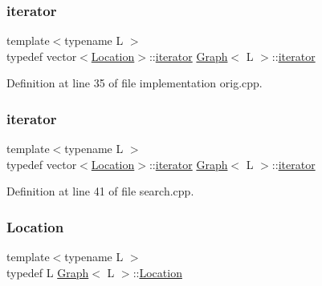 \subsubsection{\texorpdfstring{iterator}{iterator}\hspace{0.1cm}{\footnotesize\ttfamily [1/2]}}
{\footnotesize\ttfamily template$<$typename L $>$ \\
typedef vector$<$\mbox{\hyperlink{struct_graph_aea7d42bb67163fe692353674435a1426}{Location}}$>$\+::\mbox{\hyperlink{struct_graph_af43d6412d7a6034eaeacde8ca1c1d984}{iterator}} \mbox{\hyperlink{struct_graph}{Graph}}$<$ L $>$\+::\mbox{\hyperlink{struct_graph_af43d6412d7a6034eaeacde8ca1c1d984}{iterator}}}



Definition at line 35 of file implementation orig.\+cpp.

\mbox{\label{struct_graph_af43d6412d7a6034eaeacde8ca1c1d984}} 
\subsubsection{\texorpdfstring{iterator}{iterator}\hspace{0.1cm}{\footnotesize\ttfamily [2/2]}}
{\footnotesize\ttfamily template$<$typename L $>$ \\
typedef vector$<$\mbox{\hyperlink{struct_graph_aea7d42bb67163fe692353674435a1426}{Location}}$>$\+::\mbox{\hyperlink{struct_graph_af43d6412d7a6034eaeacde8ca1c1d984}{iterator}} \mbox{\hyperlink{struct_graph}{Graph}}$<$ L $>$\+::\mbox{\hyperlink{struct_graph_af43d6412d7a6034eaeacde8ca1c1d984}{iterator}}}



Definition at line 41 of file search.\+cpp.

\mbox{\label{struct_graph_aea7d42bb67163fe692353674435a1426}} 
\subsubsection{\texorpdfstring{Location}{Location}\hspace{0.1cm}{\footnotesize\ttfamily [1/2]}}
{\footnotesize\ttfamily template$<$typename L $>$ \\
typedef L \mbox{\hyperlink{struct_graph}{Graph}}$<$ L $>$\+::\mbox{\hyperlink{struct_graph_aea7d42bb67163fe692353674435a1426}{Location}}}



